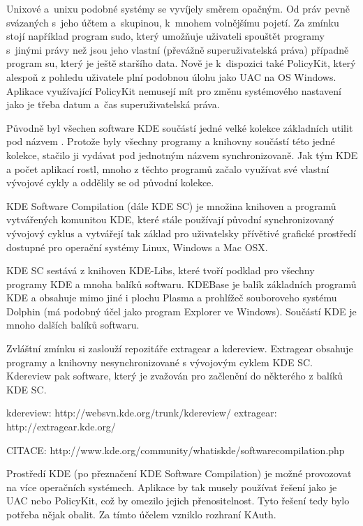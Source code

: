 Unixové a~unixu podobné systémy se vyvíjely směrem opačným. Od práv pevně svázaných s~jeho účtem a~skupinou, k~mnohem volnějšímu pojetí. Za zmínku stojí například program sudo, který umožňuje uživateli spouštět programy s~jinými právy než jsou jeho vlastní (převážně superuživatelská práva) případně program su, který je ještě staršího data. Nově je k~dispozici také PolicyKit, který alespoň z pohledu uživatele plní podobnou úlohu jako UAC na OS Windows. Aplikace využívající PolicyKit nemusejí mít pro změnu systémového nastavení jako je třeba datum a~čas superuživatelská práva.


Původně byl všechen software KDE součástí jedné velké kolekce základních utilit pod názvem . Protože byly všechny programy a knihovny součástí této jedné kolekce, stačilo ji vydávat pod jednotným názvem synchronizovaně. Jak tým KDE a počet aplikací rostl, mnoho z těchto programů začalo využívat své vlastní vývojové cykly a oddělily se od původní kolekce.

KDE Software Compilation (dále KDE SC) je množina knihoven a programů vytvářených komunitou KDE, které stále používají původní synchronizovaný vývojový cyklus a vytvářejí tak základ pro uživatelsky přívětivé  grafické prostředí dostupné pro operační systémy Linux, Windows a Mac OSX.

KDE SC sestává z knihoven KDE-Libs, které tvoří podklad pro všechny programy KDE a mnoha balíků softwaru. KDEBase je balík základních programů KDE a obsahuje mimo jiné i plochu Plasma a prohlížeč souboroveho systému Dolphin (má podobný účel jako program Explorer ve Windows). Součástí KDE je mnoho dalších balíků softwaru.

Zvláštní zmínku si zaslouží repozitáře extragear a kdereview. Extragear obsahuje programy a knihovny nesynchronizované s vývojovým cyklem KDE SC. Kdereview pak software, který je zvažován pro začlenění do některého z balíků KDE SC.

kdereview: http://websvn.kde.org/trunk/kdereview/
extragear: http://extragear.kde.org/

CITACE: http://www.kde.org/community/whatiskde/softwarecompilation.php

Prostředí KDE (po přeznačení KDE Software Compilation) je možné provozovat na více operačních systémech. Aplikace by tak musely používat řešení jako je UAC nebo PolicyKit, což by omezilo jejich přenositelnost. Tyto řešení tedy bylo potřeba nějak obalit. Za tímto účelem vzniklo rozhraní KAuth.

